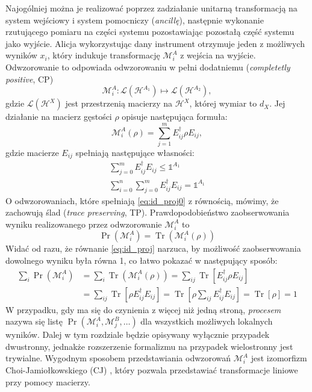 \documentclass[10pt]{article} %
\DeclareMathOperator{\Trs}{Tr}
\newcommand{\Mats}[1]{\mathcal{L}(#1)}
\newcommand{\Hx}[1]{\mathcal{H}^{#1}}
\newcommand{\LHx}[1]{\Mats{\Hx{#1}}}
\newcommand{\MXi}[3]{\mathcal{M}^{#1}_{#2}(#3)}
\newcommand{\MXin}[2]{\mathcal{M}^{#1}_{#2}}
\newcommand{\MAin}[0]{\MXin{A}{i}}
\newcommand{\MAi}[1]{\MXi{A}{i}{#1}}
\newcommand{\MAir}{\MAi{\rho}}
\newcommand{\Idx}[1]{\mathbb{1}^{#1}}
\newcommand{\Tr}[1]{\Trs(#1)}
\newcommand{\Pro}[1]{\Pr(#1)}
\begin{document}
Najogólniej można je realizować poprzez zadziałanie unitarną transformacją na system wejściowy i system pomocniczy (\textit{ancillę}), następnie wykonanie rzutującego pomiaru na części systemu pozostawiając pozostałą część systemu jako wyjście. Alicja wykorzystując dany instrument otrzymuje jeden z możliwych wyników $x_i$, który indukuje transformację $\mathcal{M}^A_i$ z wejścia na wyjście. Odwzorowanie to odpowiada odwzorowaniu w pełni dodatniemu (\textit{completetly positive}, CP)
\begin{equation}
\mathcal{M}^A_i : \mathcal{L}(\mathcal{H}^{A_1}) \mapsto \mathcal{L}(\mathcal{H}^{A_2}),
\end{equation}
gdzie $\LHx{X}$ jest przestrzenią macierzy na $\Hx{X}$, której wymiar to $d_X$. Jej działanie na macierz gęstości $\rho$ opisuje następująca formuła:
\begin{equation}
\label{yolo}
\MAi{\rho} = \sum^m_{j=1} E_{ij} ^\dag \rho E_{ij},
\end{equation}
gdzie macierze $E_{ij}$ spełniają następujące własności:
\begin{gather}
\label{eq:id_proj0} 
\sum^m_{j=0} E_{ij}^\dag E_{ij} \leq \Idx{A_1} \\
\label{eq:id_proj} 
\sum^n_{i=0} \sum^m_{j=0} E_{ij}^\dag E_{ij} = \Idx{A_1}
\end{gather}
O odwzorowaniach, które spełniają \eqref{eq:id_proj0} z równością, mówimy, że zachowują ślad (\textit{trace preserving}, TP).
Prawdopodobieństwo zaobserwowania wyniku realizowanego przez odwzorowanie $\MAin$ to
\begin{equation}
\label{eq:probqi}
\Pro{\MAin} = \Tr{\MAir}
\end{equation}
Widać od razu, że równanie \eqref{eq:id_proj} narzuca, by możliwość zaobserwowania dowolnego wyniku była równa 1, co łatwo pokazać w następujący sposób:
\begin{equation}
\begin{split}
\sum_i \Pro{\MAin} &= \sum_i \Tr{\MAir} = \sum_{ij} \Trs \left[E^\dag_{ij}\rho E_{ij}\right]\\ &= \sum_{ij} \Trs\left[ \rho E^\dag_{ij}E_{ij}\right] = \Trs \left[ \rho \sum_{ij}  E^\dag_{ij}E_{ij}\right] = \Trs \left[ \rho \right] = 1
\end{split}
\end{equation}
W przypadku, gdy ma się do czynienia z więcej niż jedną stroną, \textit{procesem} nazywa się listę $\Pr(\MXin{A}{i}, \MXin{B}{j}, \dots)$ dla wszystkich możliwych lokalnych wyników. Dalej w tym rozdziale będzie opisywany wyłącznie przypadek dwustronny, jednakże rozszerzenie formalizmu na przypadek wielostronny jest trywialne. Wygodnym sposobem przedstawiania odwzorowań $\MAin$ jest izomorfizm Choi-Jamiołkowskiego (CJ) \cite{cj_iso1, cj_iso2}, który pozwala przedstawiać transformacje liniowe przy pomocy macierzy. 
\end{document}
